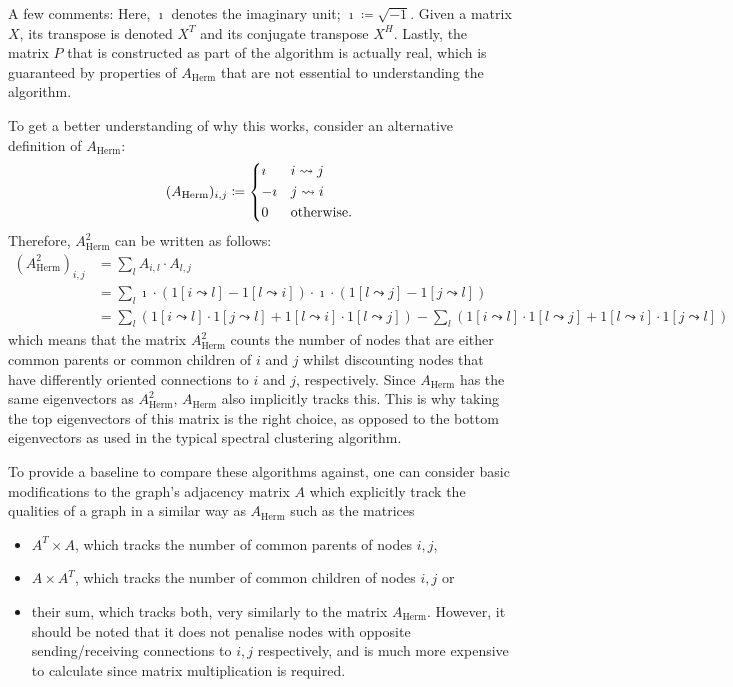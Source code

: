 A few comments: Here, $\imath$ denotes the imaginary unit; $\imath \coloneqq \sqrt{-1}$. Given a 
matrix $X$, its transpose is denoted $X^T$ and its conjugate transpose $X^H$. Lastly, the matrix $P
$ that is constructed as part of the algorithm is actually real, which is guaranteed by properties 
of $A_\mathrm{Herm}$ that are not essential to understanding the algorithm.

To get a better understanding of why this works, consider an alternative definition of 
$A_\mathrm{Herm}$:
$$
	(A_\mathrm{Herm})_{i,j} \coloneqq
	\begin{dcases}
		\imath & i \leadsto j \\
		- \imath & j \leadsto i \\
		0 & \text{otherwise.}
	\end{dcases}
$$
Therefore, $A_\mathrm{Herm}^2$ can be written as follows:
\begin{align*}
	(A_{\mathrm{Herm}}^2)_{i,j} &= \sum_{l} A_{i,l} \cdot A_{l, j} \\
	&=\sum_l \imath \cdot (1[i \leadsto l] - 1[l \leadsto i]) \cdot \imath \cdot 
	(1[l \leadsto j] - 1[j \leadsto l]) \\
	&= \sum_l (1[i \leadsto l]\cdot1[j \leadsto l] + 1[l \leadsto i]\cdot1[l 
	\leadsto j]) - \sum_l (1[i \leadsto l]\cdot1[l \leadsto j] + 1[l \leadsto i]\cdot1[j 
	\leadsto l])
\end{align*}
which means that the matrix $A_\mathrm{Herm}^2$ counts the number of nodes that are either common 
parents or common children of $i$ and $j$ whilst discounting nodes that have differently oriented 
connections to $i$ and $j$, respectively. Since $A_\mathrm{Herm}$ has the same eigenvectors as 
$A_\mathrm{Herm}^2$, $A_\mathrm{Herm}$ also implicitly tracks this. This is why taking the top 
eigenvectors of this matrix is the right choice, as opposed to the bottom eigenvectors as used in 
the typical spectral clustering algorithm. 

To provide a baseline to compare these algorithms against, one can consider basic modifications
to the graph's adjacency matrix $A$ which explicitly track the qualities of a graph in a similar 
way as $A_\mathrm{Herm}$ such as the matrices
\begin{itemize}
	\item $A^T \times A$, which tracks the number of common parents of nodes $i, j$,
	\item $A \times A^T$, which tracks the number of common children of nodes $i,j$ or
	\item their sum, which tracks both, very similarly to the matrix $A_\mathrm{Herm}$. However, 
	it should be noted that it does not penalise nodes with opposite sending/receiving 
	connections to $i,j$ respectively, and is much more expensive to calculate since matrix 
	multiplication is required.
\end{itemize}

